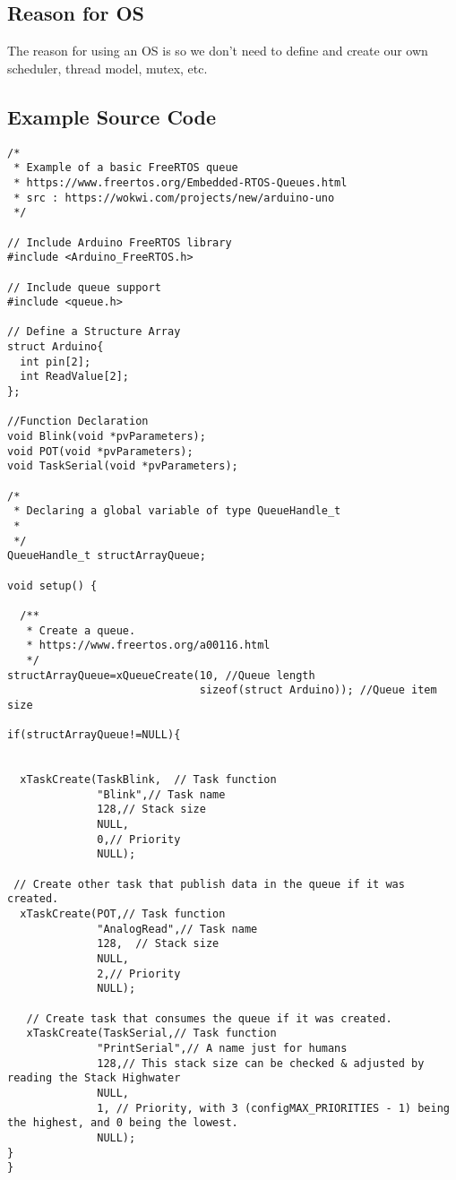 \documentclass{article}
\begin{document}
\subsection*{Reason for OS}
The reason for using an OS is so we don't need to define and create our own scheduler, thread model, mutex, etc.

\subsection*{Example Source Code}

\begin{lstlisting}[style=cpp]
/*
 * Example of a basic FreeRTOS queue
 * https://www.freertos.org/Embedded-RTOS-Queues.html
 * src : https://wokwi.com/projects/new/arduino-uno
 */

// Include Arduino FreeRTOS library
#include <Arduino_FreeRTOS.h>

// Include queue support
#include <queue.h>

// Define a Structure Array
struct Arduino{
  int pin[2];
  int ReadValue[2];
};

//Function Declaration
void Blink(void *pvParameters);
void POT(void *pvParameters);
void TaskSerial(void *pvParameters);

/* 
 * Declaring a global variable of type QueueHandle_t 
 * 
 */
QueueHandle_t structArrayQueue;

void setup() {

  /**
   * Create a queue.
   * https://www.freertos.org/a00116.html
   */
structArrayQueue=xQueueCreate(10, //Queue length
                              sizeof(struct Arduino)); //Queue item size
                              
if(structArrayQueue!=NULL){

  
  xTaskCreate(TaskBlink,  // Task function
              "Blink",// Task name
              128,// Stack size 
              NULL,
              0,// Priority
              NULL);
 
 // Create other task that publish data in the queue if it was created.
  xTaskCreate(POT,// Task function
              "AnalogRead",// Task name
              128,  // Stack size
              NULL,
              2,// Priority
              NULL);

   // Create task that consumes the queue if it was created.
   xTaskCreate(TaskSerial,// Task function
              "PrintSerial",// A name just for humans
              128,// This stack size can be checked & adjusted by reading the Stack Highwater
              NULL,
              1, // Priority, with 3 (configMAX_PRIORITIES - 1) being the highest, and 0 being the lowest.
              NULL);
}
}


\end{lstlisting}
\end{document}
